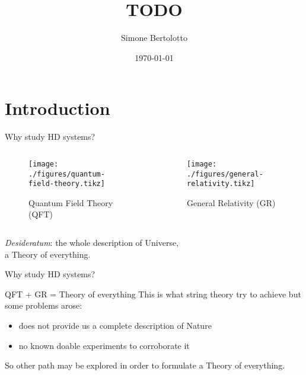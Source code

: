 \documentclass[10pt]{beamer}
\title{TODO}
\date{\today}
\author{Simone Bertolotto}
\institute{Università degli studi di Torino --- Fisica}
\begin{document}
  \maketitle

  \section{Introduction}

  \begin{frame}{Why study HD systems?}
    \begin{columns}
      \begin{column}{0.5\textwidth}
        \begin{figure}
          \texttt{[image: ./figures/quantum-field-theory.tikz]}
          \caption[labelformat=empty]{Quantum Field Theory (QFT)}\label{fig:QFT}
        \end{figure}
      \end{column}
      \begin{column}{0.5\textwidth}
        \begin{figure}
          \texttt{[image: ./figures/general-relativity.tikz]}
          \caption[labelformat=empty]{General Relativity (GR)}\label{fig:GR}
        \end{figure}
      \end{column}
    \end{columns}
    \vspace{1em}
    \begin{center}
      \emph{Desideratum}: the whole description of Universe, \\
      a \alert{Theory of everything}.
    \end{center}
  \end{frame}

  \begin{frame}{Why study HD systems?}
    \begin{alertblock}{QFT + GR = Theory of everything}
        \vspace{0.5em}
        This is what string theory try to achieve but some problems arose:
        \begin{itemize}
          \item does not provide us a complete description of Nature
          \item no known doable experiments to corroborate it
        \end{itemize}
    \end{alertblock}
    So other path may be explored in order to formulate a Theory of everything.
  \end{frame}
\end{document}
